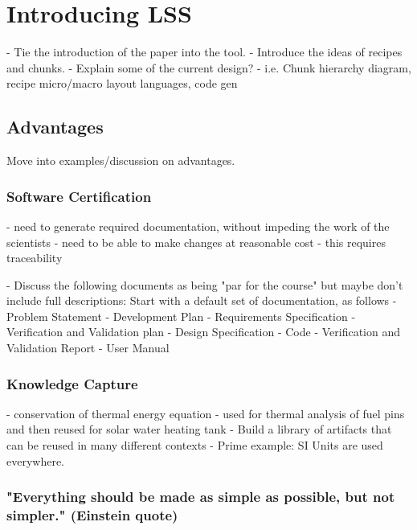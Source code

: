 \documentclass{sig-alternate-05-2015}
\begin{document}
\section{Introducing LSS} \label{sec:lss} %

- Tie the introduction of the paper into the tool.
- Introduce the ideas of recipes and chunks.
- Explain some of the current design?
  - i.e. Chunk hierarchy diagram, recipe micro/macro layout languages, code gen

\subsection{Advantages} \label{ssec:advantages}

Move into examples/discussion on advantages.

\subsubsection{Software Certification} \label{sssec:adv_cert}
- need to generate required documentation, without impeding the work of the scientists
- need to be able to make changes at reasonable cost - this requires traceability

- Discuss the following documents as being "par for the course" but maybe don't 
  include full descriptions:
    Start with a default set of documentation, as follows
    - Problem Statement
    - Development Plan
    - Requirements Specification
    - Verification and Validation plan
    - Design Specification
    - Code
    - Verification and Validation Report
    - User Manual

\subsubsection{Knowledge Capture} \label{sssec:adv_knowledge}
- conservation of thermal energy equation - used for thermal analysis of fuel pins and then reused for solar water heating tank
- Build a library of artifacts that can be reused in many different contexts
- Prime example: SI Units are used everywhere.

\subsubsection{"Everything should be made as simple as possible, but not simpler."  (Einstein quote)} \label{sssec:adv_simple}
\end{document}
